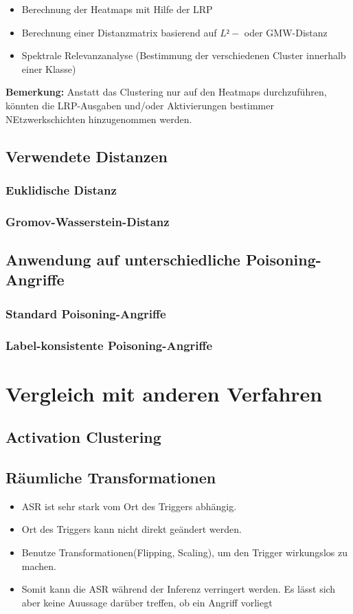 \documentclass{article}
\theoremstyle{break}
\begin{document}
	\begin{itemize}
		\item Berechnung der Heatmaps mit Hilfe der LRP
		\item Berechnung einer Distanzmatrix basierend auf $L²-$ oder GMW-Distanz
		\item Spektrale Relevanzanalyse (Bestimmung der verschiedenen Cluster innerhalb einer Klasse)
	\end{itemize}

	\noindent  \textbf{Bemerkung:} Anstatt das Clustering nur auf den Heatmaps durchzuführen, könnten die LRP-Ausgaben und/oder Aktivierungen bestimmer NEtzwerkschichten hinzugenommen werden.
	\subsection{Verwendete Distanzen}
	\subsubsection{Euklidische Distanz}
	\subsubsection{Gromov-Wasserstein-Distanz}
	\subsection{Anwendung auf unterschiedliche Poisoning-Angriffe}	\subsubsection{Standard Poisoning-Angriffe}
	\subsubsection{Label-konsistente Poisoning-Angriffe}
	\section{Vergleich mit anderen Verfahren}
	\subsection{Activation Clustering}
	\subsection{Räumliche Transformationen}
	\begin{itemize}
		\item ASR ist sehr stark vom Ort des Triggers abhängig.
		\item Ort des Triggers kann nicht direkt geändert werden.
		\item Benutze Transformationen(Flipping, Scaling), um den Trigger wirkungslos zu machen.
		\item Somit kann die ASR während der Inferenz verringert werden. Es lässt sich aber keine Auussage darüber treffen, ob ein Angriff vorliegt
	\end{itemize}
	
\end{document}
